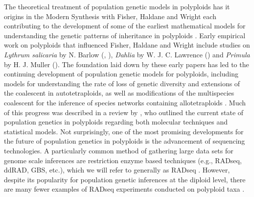 \documentclass[11pt,english,letterpaper,oneside]{article}
\begin{document}
The theoretical treatment of population genetic models in polyploids has it origins in the Modern Synthesis with  Fisher, Haldane and Wright each contributing to the development of some of the earliest mathematical models for understanding the genetic patterns of inheritance in polyploids \citep{haldane1930autopolyploids,wright1938polyploid,fisher1943doublereduction}. Early empirical work on polyploids that influenced Fisher, Haldane and Wright include studies on \textit{Lythrum salicaria} by N. Barlow (\citeyear{barlow1913heterostylism}, \citeyear{barlow1923trimorphic}), \textit{Dahlia} by W. J. C. Lawrence (\citeyear{lawrence1929dahlia}) and \textit{Primula} by H. J. Muller (\citeyear{muller1914primula}). The foundation laid down by these early papers has led to the continuing development of population genetic models for polyploids, including models for understanding the rate of loss of genetic diversity and extensions of the coalescent in autotetraploids, as well as modifications of the multispecies coalescent for the inference of species networks containing allotetraploids \citep{moody1993autopolyploids,arnold2012autotetraploidCoal,jones2013allopolyploid}. Much of this progress was described in a review by \cite{dufresne2014polyPopGen}, who outlined the current state of population genetics in polyploids regarding both molecular techniques and statistical models. Not surprisingly, one of the most promising developments for the future of population genetics in polyploids is the advancement of sequencing technologies. A particularly common method of gathering large data sets for genome scale inferences are restriction enzyme based techniques (e.g., RADseq, ddRAD, GBS, etc.), which we will refer to generally as RADseq \citep{miller2007gbs,baird2008radTags,peterson2012ddrad,puritz2014demystifyingRAD}. However, despite its popularity for population genetic inferences at the diploid level, there are many fewer examples of RADseq experiments conducted on polyploid taxa \citep[but see][]{ogden2013sturgeonRADseq,wang2013birchRADseq,logan-young2015polyploidSNP}.
\medskip
\end{document}

